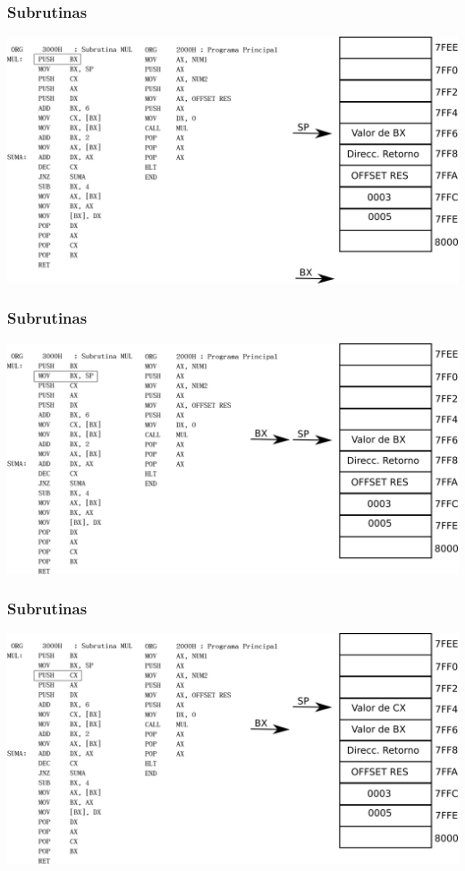 \documentclass{beamer}
\begin{document}
\begin{frame}
\frametitle{Subrutinas}
\includegraphics[scale=0.70]{imgs/imagen_006.png}
\end{frame}
\begin{frame}
\frametitle{Subrutinas}
\includegraphics[scale=0.70]{imgs/imagen_007.png}
\end{frame}
\begin{frame}
\frametitle{Subrutinas}
\includegraphics[scale=0.70]{imgs/imagen_008.png}
\end{frame}
\end{document}
